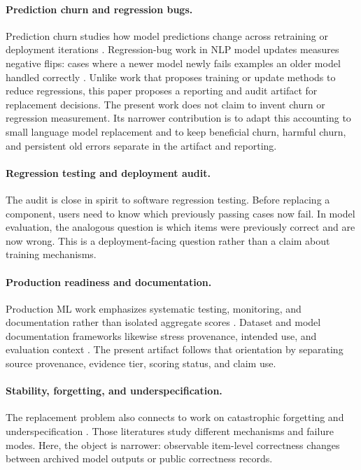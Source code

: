 \documentclass[manuscript, screen, review, nonacm]{jair}
\begin{document}
\paragraph{Prediction churn and regression bugs.}
Prediction churn studies how model predictions change across retraining or deployment iterations \parencite{fard2016churn}. Regression-bug work in NLP model updates measures negative flips: cases where a newer model newly fails examples an older model handled correctly \parencite{xie2021regression}. Unlike work that proposes training or update methods to reduce regressions, this paper proposes a reporting and audit artifact for replacement decisions. The present work does not claim to invent churn or regression measurement. Its narrower contribution is to adapt this accounting to small language model replacement and to keep beneficial churn, harmful churn, and persistent old errors separate in the artifact and reporting.

\paragraph{Regression testing and deployment audit.}
The audit is close in spirit to software regression testing. Before replacing a component, users need to know which previously passing cases now fail. In model evaluation, the analogous question is which items were previously correct and are now wrong. This is a deployment-facing question rather than a claim about training mechanisms.

\paragraph{Production readiness and documentation.}
Production ML work emphasizes systematic testing, monitoring, and documentation rather than isolated aggregate scores \parencite{sculley2015technicaldebt,breck2017mltestscore}. Dataset and model documentation frameworks likewise stress provenance, intended use, and evaluation context \parencite{gebru2021datasheets,mitchell2019modelcards}. The present artifact follows that orientation by separating source provenance, evidence tier, scoring status, and claim use.

\paragraph{Stability, forgetting, and underspecification.}
The replacement problem also connects to work on catastrophic forgetting \parencite{kirkpatrick2017overcoming} and underspecification \parencite{damour2022underspecification}. Those literatures study different mechanisms and failure modes. Here, the object is narrower: observable item-level correctness changes between archived model outputs or public correctness records.
\end{document}

